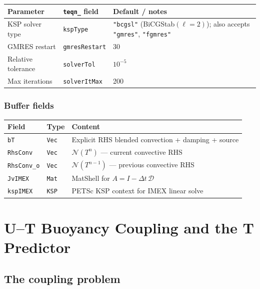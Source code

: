 \documentclass[12pt,a4paper]{article}
\begin{document}
\begin{center}
\begin{tabular}{lll}
\toprule
\textbf{Parameter} & \textbf{\texttt{teqn\_} field} & \textbf{Default / notes} \\
\midrule
KSP solver type & \texttt{kspType} &
  \texttt{"bcgsl"} (BiCGStab$(\ell{=}2)$); also accepts
  \texttt{"gmres"}, \texttt{"fgmres"} \\
GMRES restart & \texttt{gmresRestart} & 30 \\
Relative tolerance & \texttt{solverTol} & $10^{-5}$ \\
Max iterations & \texttt{solverItMax} & 200 \\
\bottomrule
\end{tabular}
\end{center}

\subsubsection*{Buffer fields}

\begin{center}
\begin{tabular}{lll}
\toprule
\textbf{Field} & \textbf{Type} & \textbf{Content} \\
\midrule
\texttt{bT}       & \texttt{Vec} & Explicit RHS blended convection + damping + source \\
\texttt{RhsConv}  & \texttt{Vec} & $\mathcal{N}(T^n)$ — current convective RHS \\
\texttt{RhsConv\_o} & \texttt{Vec} & $\mathcal{N}(T^{n-1})$ — previous convective RHS \\
\texttt{JvIMEX}   & \texttt{Mat} & MatShell for $A = I - \Delta t\,\mathcal{D}$ \\
\texttt{kspIMEX}  & \texttt{KSP} & PETSc KSP context for IMEX linear solve \\
\bottomrule
\end{tabular}
\end{center}

\section{U--T Buoyancy Coupling and the T Predictor}
\label{sec:teqn-coupling}

\subsection*{The coupling problem}
\end{document}
